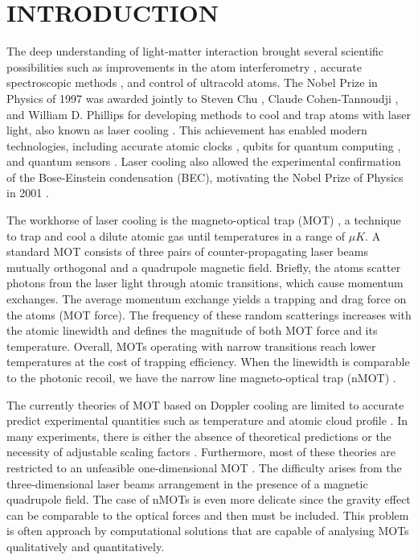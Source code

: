 %
%
\chapter{INTRODUCTION}
\label{ch:introduction}

The deep understanding of light-matter interaction brought several scientific possibilities such as improvements in the atom interferometry \cite{peters2001high}, accurate spectroscopic methods \cite{mukamel2020roadmap}, and control of ultracold atoms. 
The Nobel Prize in Physics of 1997 was awarded jointly to Steven Chu \cite{chu1998nobel}, Claude Cohen-Tannoudji \cite{cohen1998nobel}, and William D. Phillips \cite{phillips1998nobel} for developing methods to cool and trap atoms with laser light, also known as laser cooling \cite{metcalf2007laser}. This achievement has enabled modern technologies, including accurate atomic clocks \cite{ludlow2015optical}, qubits for quantum computing \cite{schneider2012quantum}, and quantum sensors \cite{zhang2016precision}. Laser cooling also allowed the experimental confirmation of the Bose-Einstein condensation (BEC), motivating the Nobel Prize of Physics in 2001 \cite{cornell2002nobel, ketterle2002nobel}.

The workhorse of laser cooling is the magneto-optical trap (MOT) \cite{krzysztof2010magneto}, a technique to trap and cool a dilute atomic gas until temperatures in a range of $\mu K$. A standard MOT consists of three pairs of counter-propagating laser beams mutually orthogonal and a quadrupole magnetic field. Briefly, the atoms scatter photons from the laser light through atomic transitions, which cause momentum exchanges. The average momentum exchange yields a trapping and drag force on the atoms (MOT force). The frequency of these random scatterings increases with the atomic linewidth and defines the magnitude of both MOT force and its temperature. Overall, MOTs operating with narrow transitions reach lower temperatures at the cost of trapping efficiency. When the linewidth is comparable to the photonic recoil, we have the narrow line magneto-optical trap (nMOT) \cite{frisch2012narrow, maier2014narrow, miyazawa2021narrow}.

The currently theories of MOT based on Doppler cooling are limited to accurate predict experimental quantities such as temperature \cite{lett1988observation} and atomic cloud profile \cite{gattobigio2010scaling}. In many experiments, there is either the absence of theoretical predictions or the necessity of adjustable scaling factors \cite{loo2003investigations}. Furthermore, most of these theories are restricted to an unfeasible one-dimensional MOT \cite{metcalf2007laser, balykin2000electromagnetic}. The difficulty arises from the three-dimensional laser beams arrangement in the presence of a magnetic quadrupole field. The case of nMOTs is even more delicate since the gravity effect can be comparable to the optical forces and then must be included. This problem is often approach by computational solutions \cite{chaudhuri2006realization, atutov2001sodium,hanley2018quantitative} that are capable of analysing MOTs qualitatively and quantitatively.

